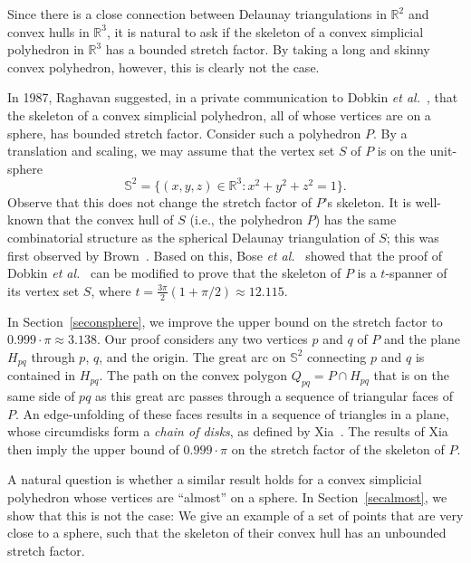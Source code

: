 \documentclass[12pt]{article}
\newcommand{\IR}{\mathbb{R}}
\newcommand{\IS}{\mathbb{S}}
\begin{document}
Since there is a close connection between Delaunay triangulations in 
$\IR^2$ and convex hulls in $\IR^3$, it is natural to ask if the skeleton 
of a convex simplicial polyhedron in $\IR^3$ has a bounded stretch 
factor. By taking a long and skinny convex polyhedron, however, this is 
clearly not the case. 

In 1987, Raghavan suggested, in a private communication to
Dobkin \emph{et al.}~\cite{dfs-dgaag-90}, that the skeleton of a convex 
simplicial polyhedron, all of whose vertices are on a sphere, has 
bounded stretch factor. Consider such a polyhedron $P$. By a 
translation and scaling, we may assume that the vertex set $S$ of $P$ 
is on the unit-sphere 
\[ \IS^2 = \{ (x,y,z) \in \IR^3 : x^2 + y^2 + z^2 = 1 \} .  
\] 
Observe that this does not change the stretch factor of $P$'s skeleton.  
It is well-known that the convex hull of $S$ (i.e., the polyhedron $P$) 
has the same combinatorial structure as the spherical Delaunay 
triangulation of $S$; this was first  observed by 
Brown~\cite{b-gtfga-80}. Based on this, 
Bose \emph{et al.}~\cite{bps-chpss-14} showed that the proof of   
Dobkin \emph{et al.}~\cite{dfs-dgaag-90} can be modified to prove that 
the skeleton of $P$ is a $t$-spanner of its vertex set $S$, where 
$t= \frac{3 \pi}{2} (1+\pi/2) \approx 12.115$.  

In Section~\ref{seconsphere}, we improve the upper bound on the stretch 
factor to $0.999 \cdot \pi \approx 3.138$. Our proof considers any two 
vertices $p$ and $q$ of $P$ and the plane $H_{pq}$ through $p$, $q$, 
and the origin. The great arc on $\IS^2$ connecting $p$ and $q$ is 
contained in $H_{pq}$. The path on the convex polygon 
$Q_{pq} = P \cap H_{pq}$ that is on the same side of $pq$ as this 
great arc passes through a sequence of triangular faces of $P$. 
An edge-unfolding of these faces results in a sequence of triangles in 
a plane, whose circumdisks form a \emph{chain of disks}, as defined 
by Xia~\cite{x-sfdtl-13}. The results of Xia then imply the upper 
bound of $0.999 \cdot \pi$ on the stretch factor of the skeleton of $P$. 

A natural question is whether a similar result holds for a convex 
simplicial polyhedron whose vertices are ``almost'' on a sphere. 
In Section~\ref{secalmost}, we show that this is not the case: We give 
an example of a set of points that are very close to a sphere, such that 
the skeleton of their convex hull has an unbounded stretch factor. 
\end{document}
